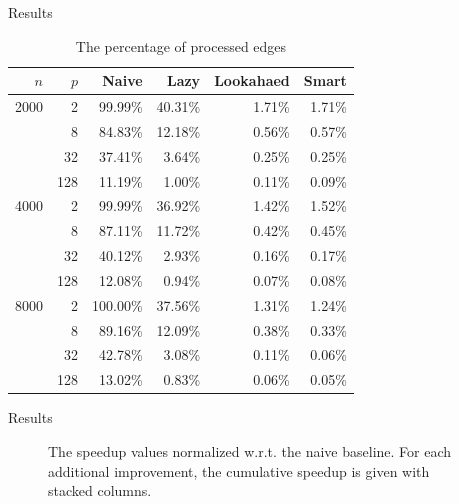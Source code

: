 \documentclass{beamer}
\begin{document}
\begin{frame}{Results}
\begin{table}[ht]
	\center
	\small
	\begin{tabular}{rr||r||rrr}
$n$		&	$p$	& Naive 	& Lazy		& Lookahaed & Smart \\\hline\hline
2000	& 2		& 99.99\%					& 40.31\%	& 1.71\%	& 1.71\%\\
		& 8		& 84.83\%					& 12.18\%	& 0.56\%	& 0.57\%\\
		& 32	& 37.41\%					& 3.64\%	& 0.25\%	& 0.25\%\\
		& 128	& 11.19\%					& 1.00\%	& 0.11\%	& 0.09\%\\\hline
4000	& 2		& 99.99\%					& 36.92\%	& 1.42\%	& 1.52\%\\
		& 8		& 87.11\%					& 11.72\%	& 0.42\%	& 0.45\%\\
		& 32	& 40.12\%					& 2.93\%	& 0.16\%	& 0.17\%\\
		& 128	& 12.08\%					& 0.94\%	& 0.07\%	& 0.08\%\\\hline
8000	& 2		& 100.00\%					& 37.56\%	& 1.31\%	& 1.24\%\\
		& 8		& 89.16\%					& 12.09\%	& 0.38\%	& 0.33\%\\
		& 32	& 42.78\%					& 3.08\%	& 0.11\%	& 0.06\%\\
		& 128	& 13.02\%					& 0.83\%	& 0.06\%	& 0.05\%
	\end{tabular}
	\caption{The percentage of processed edges}
	\label{table:edge-percent}
\end{table}
\end{frame}

\begin{frame}{Results}

\begin{figure}[ht]
	\centering
	\caption{The speedup values normalized w.r.t. the naive baseline. For each additional improvement, the cumulative speedup is given with stacked columns.}
	\label{fig:speedups}
\end{figure}
\end{frame}
\end{document}
